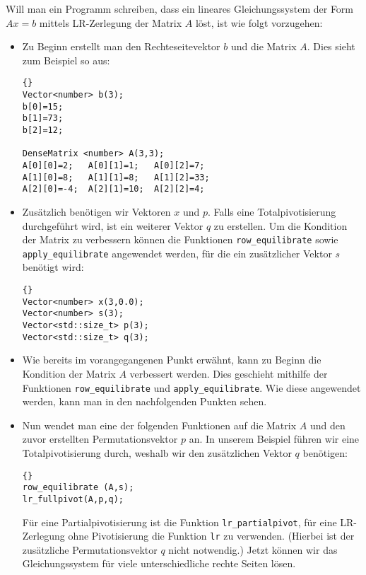 \documentclass[a4paper,11pt]{article}
\theoremstyle{definition}
\begin{document}
Will man ein Programm schreiben, dass ein lineares Gleichungssystem
der Form $Ax=b$ mittels LR-Zerlegung der Matrix $A$ löst, ist wie
folgt vorzugehen:
\begin{itemize}
\item Zu Beginn erstellt man den Rechteseitevektor $b$ und die Matrix
  $A$. Dies sieht zum Beispiel so aus:

  {\footnotesize{\begin{lstlisting}{}
Vector<number> b(3);
b[0]=15;
b[1]=73;
b[2]=12;

DenseMatrix <number> A(3,3);
A[0][0]=2;   A[0][1]=1;   A[0][2]=7;
A[1][0]=8;   A[1][1]=8;   A[1][2]=33;
A[2][0]=-4;  A[2][1]=10;  A[2][2]=4;
\end{lstlisting}}}

\item Zusätzlich benötigen wir Vektoren $x$ und $p$. Falls eine
  Totalpivotisierung durchgeführt wird, ist ein weiterer Vektor $q$ zu
  erstellen. Um die Kondition der Matrix zu verbessern können die
  Funktionen \lstinline{row_equilibrate} sowie
  \lstinline{apply_equilibrate} angewendet werden, für die ein
  zusätzlicher Vektor $s$ benötigt wird:

  {\footnotesize{\begin{lstlisting}{}
Vector<number> x(3,0.0);
Vector<number> s(3);
Vector<std::size_t> p(3);
Vector<std::size_t> q(3);
\end{lstlisting}}}

\item Wie bereits im vorangegangenen Punkt erwähnt, kann zu Beginn die
  Kondition der Matrix $A$ verbessert werden. Dies geschieht mithilfe
  der Funktionen \lstinline{row_equilibrate} und
  \lstinline{apply_equilibrate}. Wie diese angewendet werden, kann man
  in den nachfolgenden Punkten sehen.

\item Nun wendet man eine der folgenden  Funktionen auf die Matrix $A$
  und den zuvor erstellten Permutationsvektor $p$ an. In unserem
  Beispiel führen wir eine Totalpivotisierung durch, weshalb wir den
  zusätzlichen Vektor $q$ benötigen:

  {\footnotesize{\begin{lstlisting}{}
row_equilibrate (A,s);
lr_fullpivot(A,p,q);
\end{lstlisting}}}

  Für eine Partialpivotisierung ist die Funktion
  \lstinline{lr_partialpivot}, für eine LR-Zerlegung ohne Pivotisierung
  die Funktion \lstinline{lr} zu verwenden. (Hierbei ist der zusätzliche
  Permutationsvektor $q$ nicht notwendig.)  Jetzt können wir das
  Gleichungssystem für viele unterschiedliche rechte Seiten lösen.


\end{itemize}
\end{document}
